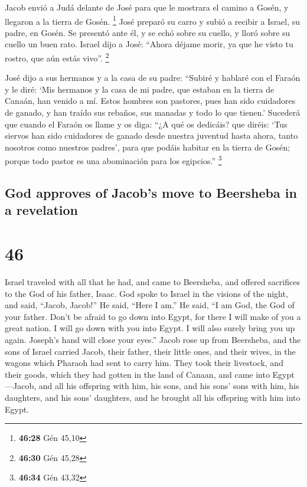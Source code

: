 \begin{paracol}{2}
 Jacob envió a Judá delante de José para que le mostrara
el camino a Gosén, y llegaron a la tierra de Gosén. \footnote{\textbf{46:28}
  Gén 45,10}  José preparó su carro y subió a recibir a
Israel, su padre, en Gosén. Se presentó ante él, y se echó sobre su
cuello, y lloró sobre su cuello un buen rato.  Israel
dijo a José: ``Ahora déjame morir, ya que he visto tu rostro, que aún
estás vivo''. \footnote{\textbf{46:30} Gén 45,28}

 José dijo a sus hermanos y a la casa de su padre:
``Subiré y hablaré con el Faraón y le diré: `Mis hermanos y la casa de
mi padre, que estaban en la tierra de Canaán, han venido a mí.
 Estos hombres son pastores, pues han sido cuidadores de
ganado, y han traído sus rebaños, sus manadas y todo lo que tienen.'
 Sucederá que cuando el Faraón os llame y os diga: ``¿A
qué os dedicáis?  que diréis: `Tus siervos han sido
cuidadores de ganado desde nuestra juventud hasta ahora, tanto nosotros
como nuestros padres', para que podáis habitar en la tierra de Gosén;
porque todo pastor es una abominación para los egipcios.'' \footnote{\textbf{46:34}
  Gén 43,32}

\switchcolumn
\begin{otherlanguage}{english}

\hypertarget{god-approves-of-jacobs-move-to-beersheba-in-a-revelation}{%
\subsection{God approves of Jacob's move to Beersheba in a
revelation}\label{god-approves-of-jacobs-move-to-beersheba-in-a-revelation}}

\hypertarget{section-91}{%
\section{46}\label{section-91}}

 Israel traveled with all that he had, and came to
Beersheba, and offered sacrifices to the God of his father, Isaac.
 God spoke to Israel in the visions of the night, and
said, ``Jacob, Jacob!'' He said, ``Here I am.''  He said,
``I am God, the God of your father. Don't be afraid to go down into
Egypt, for there I will make of you a great nation.  I
will go down with you into Egypt. I will also surely bring you up again.
Joseph's hand will close your eyes.''  Jacob rose up from
Beersheba, and the sons of Israel carried Jacob, their father, their
little ones, and their wives, in the wagons which Pharaoh had sent to
carry him.  They took their livestock, and their goods,
which they had gotten in the land of Canaan, and came into
Egypt---Jacob, and all his offspring with him,  his sons,
and his sons' sons with him, his daughters, and his sons' daughters, and
he brought all his offspring with him into Egypt.


\end{otherlanguage}
\end{paracol}
